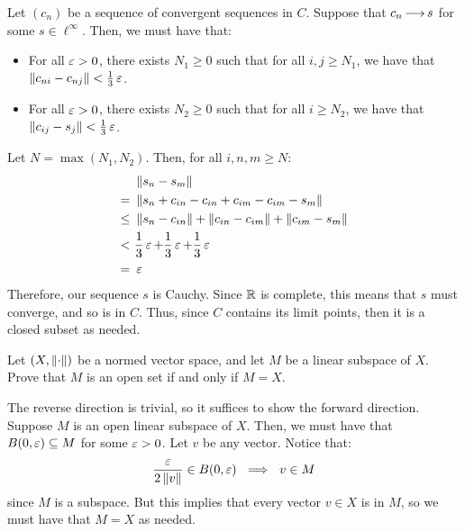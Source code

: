 \begin{soln}
    Let $ (c_{n}) $ be a sequence of convergent sequences in $ C $.
    Suppose that $ c_{n} \operatorname{\longrightarrow} s $ for some $ s \in \ell^{\infty} $.
    Then, we must have that:
    \begin{itemize}
        \item For all $ \operatorname{\varepsilon} > 0 $, there exists $ N_{1} \geq 0 $ such that for
            all $ i, j \geq N_{1} $, we have that $ \left\|c_{ni} - c_{nj}\right\|
            < \frac{1}{3}\operatorname{\varepsilon} $.
        \item For all $ \operatorname{\varepsilon} > 0 $, there exists $ N_{2} \geq 0 $ such that
            for all $ i \geq N_{2} $, we have that $ \left\|c_{ij} - s_{j}\right\|
            < \frac{1}{3}\operatorname{\varepsilon} $.
    \end{itemize}
    Let $ N = \max(N_{1}, N_{2}) $. Then, for all $ i, n, m \geq N $:
    \begin{align*}
        & \left\|s_{n} - s_{m}\right\| \\
        = \ & \left\|s_{n} + c_{in} - c_{in} + c_{im} - c_{im} - s_{m}\right\| \\
        \leq \ & \left\|s_{n} - c_{in}\right\| + \left\|c_{in} - c_{im}\right\| + \left\|c_{im}
        - s_{m}\right\| \\
        < \ & \frac{1}{3}\operatorname{\varepsilon} + \frac{1}{3}\operatorname{\varepsilon} + \frac{1}{3}\operatorname{\varepsilon} \\
        = \ & \operatorname{\varepsilon}
    \end{align*}
    Therefore, our sequence $ s $ is Cauchy. Since $ \mathbb{R} $ is complete,
    this means that $ s $ must converge, and so is in $ C $.
    Thus, since $ C $ contains its limit points, then it is a closed subset
    as needed.
\end{soln}

\begin{qu}[num=9.3]
    Let $ (X, \left\|\cdot\right\|) $ be a normed vector space, and let $ M $ be a
    linear subspace of
    $ X $. Prove that $ M $ is an open set if and only if $ M = X $.
\end{qu}

\begin{soln}
    The reverse direction is trivial, so it suffices to show the forward
    direction. Suppose $ M $ is an open linear subspace of $ X $. Then, we must
    have that $ B(0, \operatorname{\varepsilon}) \subseteq M $ for some $ \operatorname{\varepsilon} > 0 $.
    Let $ v $ be any vector. Notice that:
    \begin{equation*}
        \frac{\ep}{2\norm{v}} \in B(0, \ep) \ \implies \ v \in M
    \end{equation*}
    since $ M $ is a subspace. But this implies that every vector $ v \in X $ is
    in $ M $, so we must have that $ M = X $ as needed.
\end{soln}
